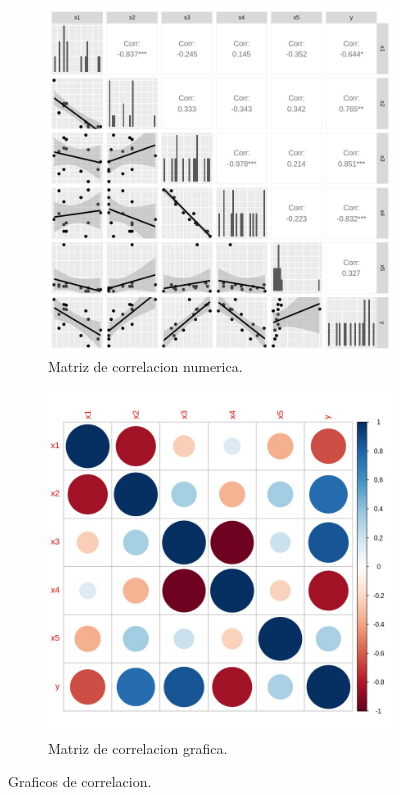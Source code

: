 \documentclass[a4paper]{article}
\begin{document}
\begin{figure}[h]
     \centering
     \begin{subfigure}[b]{0.4\textwidth}
         \centering
         \includegraphics[width=\textwidth]{pc1.jpg}
         \caption{Matriz de correlacion numerica.}
         \label{fig:corr1}
     \end{subfigure}
     \hfill
     \begin{subfigure}[b]{0.4\textwidth}
         \centering
         \includegraphics[width=\textwidth]{pr2.jpg}
         \caption{Matriz de correlacion grafica.}
         \label{fig:corr2}
     \end{subfigure}
     \hfill
        \caption{Graficos de correlacion.}
        \label{fig:three graphs}
\end{figure}
\end{document}
